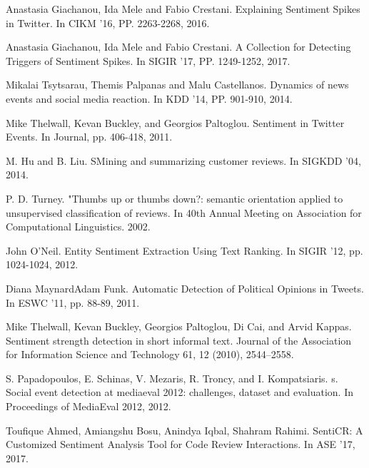 \documentclass[runningheads]{llncs}
\begin{document}
\begin{thebibliography}{8}

Anastasia Giachanou, Ida Mele and Fabio Crestani.
\newblock  Explaining Sentiment Spikes in Twitter.
\newblock In CIKM ’16, PP. 2263-2268, 2016.

Anastasia Giachanou, Ida Mele and Fabio Crestani.
\newblock  A Collection for Detecting Triggers of Sentiment Spikes.
\newblock In SIGIR ’17, PP. 1249-1252, 2017.

Mikalai Tsytsarau, Themis Palpanas and Malu Castellanos.
\newblock  Dynamics of news events and social media reaction.
\newblock In KDD ’14, PP. 901-910, 2014.

Mike Thelwall, Kevan Buckley, and Georgios Paltoglou.
\newblock Sentiment in Twitter Events.
\newblock In Journal, pp. 406-418, 2011.

M. Hu and B. Liu.
\newblock SMining and summarizing customer reviews.
\newblock In SIGKDD ’04, 2014.

P. D. Turney.
\newblock "Thumbs up or thumbs down?: semantic orientation applied to unsupervised classification of reviews.
\newblock   In 40th Annual  Meeting on Association for Computational Linguistics. 2002.

John O’Neil.
\newblock Entity Sentiment Extraction Using Text Ranking.
\newblock In SIGIR ’12, pp. 1024-1024, 2012.

Diana MaynardAdam Funk.
\newblock Automatic Detection of Political Opinions in Tweets.
\newblock In ESWC ’11, pp. 88-89, 2011.

Mike Thelwall, Kevan Buckley, Georgios Paltoglou, Di Cai, and Arvid Kappas.
\newblock Sentiment strength detection in short informal text.
\newblock Journal of the Association for Information Science and Technology 61, 12 (2010), 2544–2558.

S. Papadopoulos, E. Schinas, V. Mezaris, R. Troncy, and I. Kompatsiaris.
\newblock s. Social event detection at mediaeval 2012: challenges, dataset and evaluation.
\newblock In Proceedings of MediaEval 2012, 2012.

Toufique Ahmed, Amiangshu Bosu, Anindya Iqbal, Shahram Rahimi.
\newblock SentiCR: A Customized Sentiment Analysis Tool for Code Review Interactions.
\newblock In ASE ’17, 2017.


\end{thebibliography}
\end{document}
